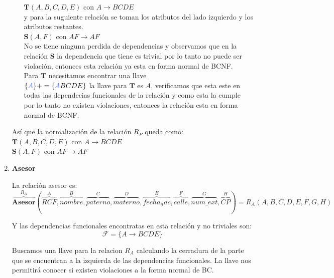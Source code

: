\documentclass[10pt]{article}
\begin{document}
\begin{enumerate}
\begin{itemize}
    	$\textbf{T}(A,B,C,D,E)$ con $A \rightarrow BCDE$\\
    	
    	y para la suguiente relación se toman los atributos del lado izquierdo y los atributos restantes.\\
    	
    	$\textbf{S}(A,F)$ con $AF \rightarrow AF$\\ 
    	
    	No se tiene ninguna perdida de dependencias y observamos que en la relación
    	$\textbf{S}$ la dependencia que tiene es trivial por lo tanto no puede ser violación, entonces esta relación ya esta en forma normal de BCNF. \\
    	Para $\textbf{T}$  necesitamos encontrar una llave\\
    	$\{\textcolor{RoyalBlue}{A}\}+= \{\textcolor{RoyalBlue}{A}BCDE\}$ la llave para $\textbf{T}$ es $A$, verificamos que esta este en todas las dependecias funcionales de la relación y como esta la cumple por lo tanto no existen violaciones, entonces la relación esta en forma normal de BCNF.\\
    \end{itemize}
    Así que la normalización de la relación $R_P$ queda como:\\
    
    	$\textbf{T}(A,B,C,D,E)$ con $A \rightarrow BCDE$\\   
    $\textbf{S}(A,F)$ con $AF \rightarrow AF$\\
   
   
   
   \item \textbf{Asesor}
   
   La relación asesor es:
   \[\overbrace{{\textbf{Asesor}}}^{\textbf{$R_{A}$}} 
   (
   \overbrace{RCF}^{A},
   \overbrace{nombre}^{B}, \overbrace{paterno}^{C}, \overbrace{materno}^{D}, \overbrace{fecha_nac}^{E}, \overbrace{calle}^{F}, \overbrace{num\_ext}^{G}, \overbrace{CP}^{H}
   )
   = 
   \textbf{$R_A$}(A,B,C,D,E,F,G,H)
   \]
   
   Y las dependencias funcionales encontratas en esta relación  y no triviales son:\\
   \[\mathcal{F} = \{A \rightarrow BCDE\}\]
   
   Buscamos una llave para la relacion $R_A$ calculando la cerradura de la parte que se encuentran a la izquierda de las dependencias funcionales. La llave nos permitirá conocer si existen violaciones a la forma normal de BC.\\
   

\end{enumerate}
\end{document}
